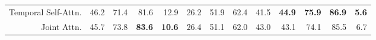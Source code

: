 \begin{table}[t]
\begin{tabular}{@{}r|rrrr|rrrr|rrrr@{}}
Temporal Self-Attn.                                                                                     & 46.2                             & 71.4                             & 81.6                              & 12.9                              & 26.2                             & 51.9                             & 62.4                              & 41.5                              & \textbf{44.9}                    & \textbf{75.9}                    & \textbf{86.9}                     & \textbf{5.6}                     \\
Joint Attn.                                                                                             & 45.7                             & 73.8                             & \textbf{83.6}                     & \textbf{10.6}                     & 26.4                             & 51.1                             & 62.0                              & 43.0                              & 43.1                             & 74.1                             & 85.5                              & 6.7                              \\ \bottomrule
\end{tabular}
\label{tab:attn_compare}
\end{table} 

